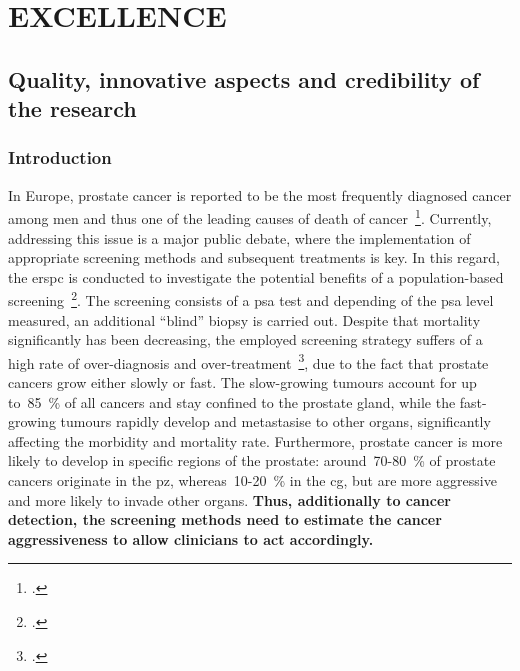 \section{EXCELLENCE}
\label{sec:excellence}

\subsection{Quality, innovative aspects and credibility of the research}
\label{sec:quality}

\subsubsection{Introduction}
\label{sec:introduction}

In Europe, prostate cancer is reported to be the most frequently diagnosed cancer among men and thus one of the leading causes of death of cancer~\footcite{Ferlay2013}. 
Currently, addressing this issue is a major public debate, where the implementation of appropriate screening methods and subsequent treatments is key.
In this regard, the \ac{erspc} is conducted to investigate the potential benefits of a population-based screening~\footcite{Schroder2015}. 
The screening consists of a \ac{psa} test and depending of the \ac{psa} level measured, an additional ``blind'' biopsy is carried out. 
Despite that mortality significantly has been decreasing, the employed screening strategy suffers of a high rate of over-diagnosis and over-treatment~\footcite{Delpierre2013}, due to the fact that prostate cancers grow either slowly or fast.
The slow-growing tumours account for up to~85~\% of all cancers and stay confined to the prostate gland, while the fast-growing tumours rapidly develop and metastasise to other organs, significantly affecting the morbidity and mortality rate.
Furthermore, prostate cancer is more likely to develop in specific regions of the prostate: around~70-80~\% of prostate cancers originate in the \ac{pz}, whereas~10-20~\% in the \ac{cg}, but are more aggressive and more likely to invade other organs. 
\textbf{Thus, additionally to cancer detection, the screening methods need to estimate the cancer aggressiveness to allow clinicians to act accordingly.}

